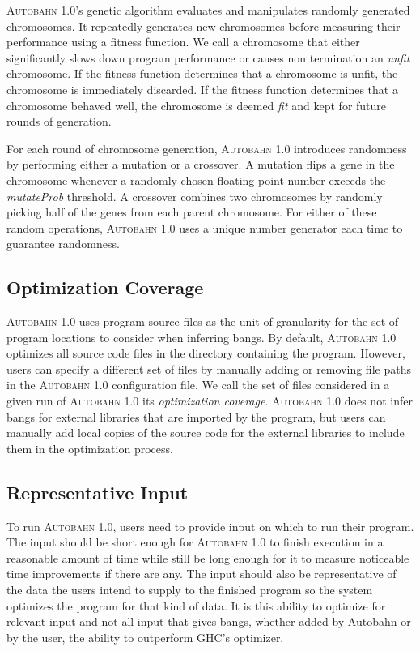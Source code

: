\documentclass[format=sigplan, review=true]{acmart}
\newcommand{\unfit}[0]{unfit}
\newcommand{\Ao}[0]{\textsc{Autobahn 1.0}}
\newcommand{\fit}[0]{fit}
\begin{document}
\Ao{}'s genetic algorithm evaluates and manipulates randomly generated
chromosomes. It repeatedly generates new chromosomes before measuring
their performance using a fitness function. We call a chromosome that
either significantly slows down program performance or causes non
termination an \textit{\unfit{}} chromosome. If the fitness function
determines that a chromosome is \unfit{}, the chromosome is
immediately discarded. If the fitness function determines that a
chromosome behaved well, the chromosome is deemed \textit{\fit{}} and
kept for future rounds of generation.

For each round of chromosome generation, \Ao{} introduces randomness
by performing either a mutation or a crossover. A mutation flips a
gene in the chromosome whenever a randomly chosen floating point
number exceeds the \textit{mutateProb} threshold. A crossover combines
two chromosomes by randomly picking half of the genes from each parent
chromosome. For either of these random operations, \Ao{} uses a unique
number generator each time to guarantee randomness.

\subsection{Optimization Coverage}
\Ao{} uses program source files as the unit of granularity for 
the set of program locations to consider when inferring bangs.  By
default, \Ao{} optimizes all source code files in the directory
containing the program. However, users can specify a different set of
files by manually adding or removing file paths in the \Ao{}
configuration file.  We call the set of files considered in a given
run of \Ao{} its \textit{optimization coverage}.
\Ao{} does not infer bangs for external libraries
that are imported by the program, but users can manually add local
copies of the source code for the external libraries to include them in the optimization process.


\subsection{Representative Input}
To run \Ao{}, users need to provide input on which to run their
program. The input should be short enough for \Ao{} to finish
execution in a reasonable amount of time while still be long enough
for it to measure noticeable time improvements if there are
any.  The input should also be representative of the data the users
intend to supply to the finished program so the system optimizes the
program for that kind of data.  It is this ability to optimize for
relevant input and not all input that gives bangs, whether added by
Autobahn or by the user, the ability to outperform GHC's optimizer. 
\end{document}

